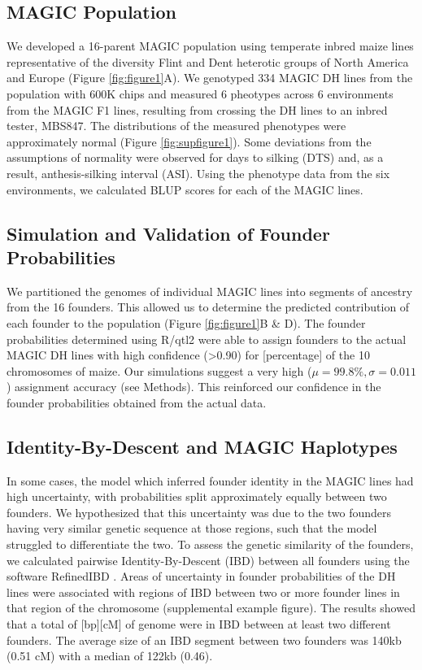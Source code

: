 \documentclass[article,9pt,twocolumn,twoside]{rilabRxiv}
\begin{document}
\subsection{MAGIC Population}

We developed a 16-parent MAGIC population using temperate inbred maize lines representative of the diversity Flint and Dent heterotic groups of North America and Europe (Figure \ref{fig:figure1}A).
We genotyped 334 MAGIC DH lines from the population with 600K chips and measured 6 pheotypes across 6 environments from the MAGIC F1 lines, resulting from crossing the DH lines to an inbred tester, MBS847.
The distributions of the measured phenotypes were approximately normal (Figure \ref{fig:supfigure1}).
Some deviations from the assumptions of normality were observed for days to silking (DTS) and, as a result, anthesis-silking interval (ASI).
Using the phenotype data from the six environments, we calculated BLUP scores for each of the MAGIC lines.

\subsection{Simulation and Validation of Founder Probabilities}

We partitioned the genomes of individual MAGIC lines into segments of ancestry from the 16 founders.
This allowed us to determine the predicted contribution of each founder to the population (Figure \ref{fig:figure1}B \& D).
The founder probabilities determined using R/qtl2 were able to assign founders to the actual MAGIC DH lines with high confidence (>0.90) for [percentage] of the 10 chromosomes of maize.
Our simulations suggest a very high ($\mu = 99.8\%, \sigma =0.011$) assignment accuracy (see Methods).
This reinforced our confidence in the founder probabilities obtained from the actual data.

\subsection{Identity-By-Descent and MAGIC Haplotypes}
In some cases, the model which inferred founder identity in the MAGIC lines had high uncertainty, with probabilities split approximately equally between two founders.
We hypothesized that this uncertainty was due to the two founders having very similar genetic sequence at those regions, such that the model struggled to differentiate the two.
To assess the genetic similarity of the founders, we calculated pairwise Identity-By-Descent (IBD) between all founders using the software RefinedIBD \cite{Browning}.
Areas of uncertainty in founder probabilities of the DH lines were associated with regions of IBD between two or more founder lines in that region of the chromosome (supplemental example figure).
The results showed that a total of [bp][cM] of genome were in IBD between at least two different founders.
The average size of an IBD segment between two founders was 140kb (0.51 cM) with a median of 122kb (0.46).
\end{document}
